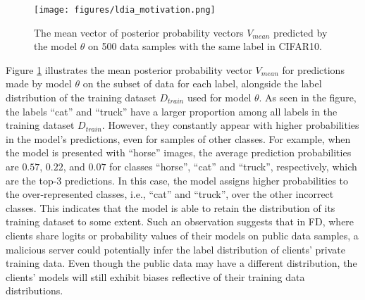 \begin{figure}[h]
    \centering
    \texttt{[image: figures/ldia\_motivation.png]}
    \caption{The mean vector of posterior probability vectors $V_{mean}$ predicted by the model $\theta$ on 500 data samples with the same label in CIFAR10.}
    \label{fig:posterior_probabilities_vector}
\end{figure}
Figure \ref{fig:posterior_probabilities_vector} illustrates the mean posterior probability vector $V_{mean}$ for predictions made by model $\theta$ on the subset of data for each label, alongside the label distribution of the training dataset $D_{train}$ used for model $\theta$.
As seen in the figure, the labels ``cat'' and ``truck'' have a larger proportion among all labels in the training dataset $D_{train}$.
However, they constantly appear with higher probabilities in the model's predictions, even for samples of other classes. 
For example, when the model is presented with ``horse'' images, the average prediction probabilities are $0.57$, $0.22$, and $0.07$ for classes ``horse'', ``cat'' and ``truck'', respectively, which are the top-3 predictions.
In this case, the model assigns higher probabilities to the over-represented classes, i.e., ``cat'' and ``truck'', over the other incorrect classes.
This indicates that the model is able to retain the distribution of its training dataset to some extent. 
Such an observation suggests that in FD, where clients share logits or probability values of their models on public data samples, a malicious server could potentially infer the label distribution of clients' private training data.
Even though the public data may have a different distribution, the clients' models will still exhibit biases reflective of their training data distributions.


